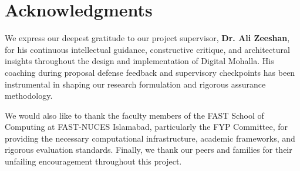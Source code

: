 \chapter*{Acknowledgments}

We express our deepest gratitude to our project supervisor, \textbf{Dr. Ali Zeeshan}, for his continuous intellectual guidance, constructive critique, and architectural insights throughout the design and implementation of Digital Mohalla. His coaching during proposal defense feedback and supervisory checkpoints has been instrumental in shaping our research formulation and rigorous assurance methodology.

We would also like to thank the faculty members of the FAST School of Computing at FAST-NUCES Islamabad, particularly the FYP Committee, for providing the necessary computational infrastructure, academic frameworks, and rigorous evaluation standards. Finally, we thank our peers and families for their unfailing encouragement throughout this project.
